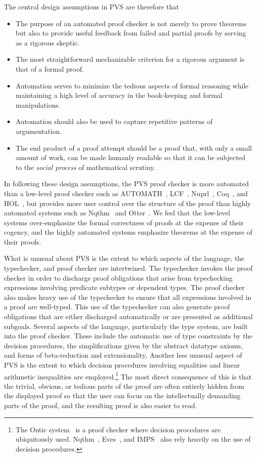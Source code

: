 The central design assumptions in PVS are therefore that
\begin{itemize}
  \item The purpose of an automated proof checker is not merely to prove
theorems but also to provide useful feedback from failed and partial proofs
by serving as a rigorous skeptic.
  \item The most straightforward mechanizable criterion for a rigorous
argument is that of a formal proof.
  \item Automation serves to minimize the tedious aspects of
formal reasoning  while maintaining a high level of accuracy in the
book-keeping and formal manipulations.
  \item Automation should also be used to capture repetitive patterns
of argumentation.
  \item The end product of a proof attempt should be a proof that, with
only a small amount of work, can be made humanly readable so that it can
be subjected to the {\em social process\/} of mathematical scrutiny.
\end{itemize}
In following these design assumptions, the PVS proof checker 
is more automated than a low-level proof checker such as
AUTOMATH~\cite{deBruijn80}, LCF~\cite{LCF}, Nuprl~\cite{Constable86},
Coq~\cite{Coquand-Huet85}, and HOL~\cite{Gordon:HOL}, but provides more
user control over the structure of the proof than highly
automated systems such as Nqthm~\cite{Boyer-Moore79,boyer-moore88} and
Otter~\cite{Otter90}.  We feel that the low-level systems over-emphasize
the formal correctness of proofs at the expense of their cogency, and
the highly automated systems emphasize theorems at the expense of their
proofs.

What is unusual about PVS is the extent to which aspects of the
language, the typechecker, and proof checker are intertwined.  The
typechecker invokes the proof checker in order to discharge proof
obligations that arise from typechecking expressions involving predicate
subtypes or dependent types.  The proof checker also makes heavy use of
the typechecker to ensure that all expressions involved in a proof are
well-typed.  This use of the typechecker can also generate proof
obligations that are either discharged automatically or are presented as
additional subgoals.  Several aspects of the language, particularly the
type system, are built into the proof checker.  These include the
automatic use of type constraints by the decision procedures, the
simplifications given by the abstract datatype axioms, and forms of
beta-reduction and extensionality, Another less unusual aspect of PVS is
the extent to which decision procedures involving equalities and linear
arithmetic inequalities are employed.\footnote{The Ontic
system~\cite{mcallester89} is a proof checker where decision procedures
are ubiquitously used.  Nqthm~\cite{Boyer-Moore79,boyer-moore88},
Eves~\cite{Pase-Saaltink}, and IMPS~\cite{IMPS91} also rely heavily on
the use of decision procedures.} The most direct consequence of this is
that the trivial, obvious, or tedious parts of the proof are often
entirely hidden from the displayed proof so that the user can focus on
the intellectually demanding parts of the proof, and the resulting proof
is also easier to read.


